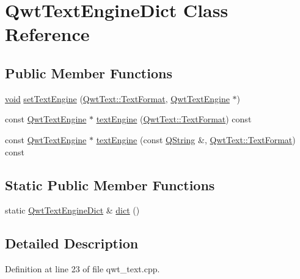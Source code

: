 \hypertarget{class_qwt_text_engine_dict}{\section{Qwt\-Text\-Engine\-Dict Class Reference}
\label{class_qwt_text_engine_dict}
}
\subsection*{Public Member Functions}
\begin{DoxyCompactItemize}
\item 
\hyperlink{group___u_a_v_objects_plugin_ga444cf2ff3f0ecbe028adce838d373f5c}{void} \hyperlink{class_qwt_text_engine_dict_a00d439b900ff19070f6c8cb95764fe60}{set\-Text\-Engine} (\hyperlink{class_qwt_text_a63e0d6a59a427a37ed0bfa71b782fd76}{Qwt\-Text\-::\-Text\-Format}, \hyperlink{class_qwt_text_engine}{Qwt\-Text\-Engine} $\ast$)
\item 
const \hyperlink{class_qwt_text_engine}{Qwt\-Text\-Engine} $\ast$ \hyperlink{class_qwt_text_engine_dict_a37efa54d56f266828b9213129e08e158}{text\-Engine} (\hyperlink{class_qwt_text_a63e0d6a59a427a37ed0bfa71b782fd76}{Qwt\-Text\-::\-Text\-Format}) const 
\item 
const \hyperlink{class_qwt_text_engine}{Qwt\-Text\-Engine} $\ast$ \hyperlink{class_qwt_text_engine_dict_a6e4e2411dd5f2dd864f64f314d5477ef}{text\-Engine} (const \hyperlink{group___u_a_v_objects_plugin_gab9d252f49c333c94a72f97ce3105a32d}{Q\-String} \&, \hyperlink{class_qwt_text_a63e0d6a59a427a37ed0bfa71b782fd76}{Qwt\-Text\-::\-Text\-Format}) const 
\end{DoxyCompactItemize}
\subsection*{Static Public Member Functions}
\begin{DoxyCompactItemize}
\item 
static \hyperlink{class_qwt_text_engine_dict}{Qwt\-Text\-Engine\-Dict} \& \hyperlink{class_qwt_text_engine_dict_a9904d28bdd7b92d16063ad6e72362cf0}{dict} ()
\end{DoxyCompactItemize}


\subsection{Detailed Description}


Definition at line 23 of file qwt\-\_\-text.\-cpp.



